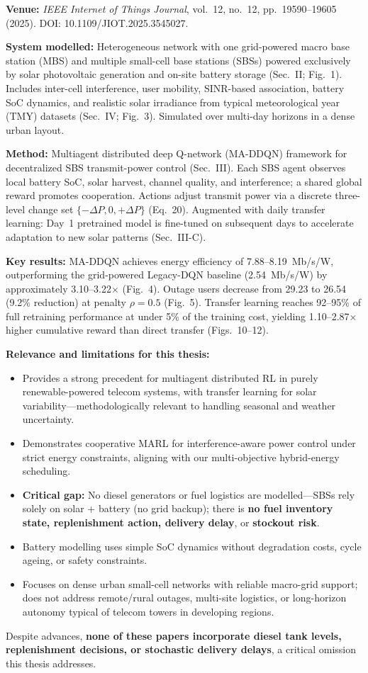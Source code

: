 \textbf{Venue:} \textit{IEEE Internet of Things Journal}, vol.~12, no.~12, pp.~19590--19605 (2025). DOI: 10.1109/JIOT.2025.3545027.

\textbf{System modelled:} Heterogeneous network with one grid-powered macro base station (MBS) and multiple small-cell base stations (SBSs) powered exclusively by solar photovoltaic generation and on-site battery storage (Sec.~II; Fig.~1). Includes inter-cell interference, user mobility, SINR-based association, battery SoC dynamics, and realistic solar irradiance from typical meteorological year (TMY) datasets (Sec.~IV; Fig.~3). Simulated over multi-day horizons in a dense urban layout.

\textbf{Method:} Multiagent distributed deep Q-network (MA-DDQN) framework for decentralized SBS transmit-power control (Sec.~III). Each SBS agent observes local battery SoC, solar harvest, channel quality, and interference; a shared global reward promotes cooperation. Actions adjust transmit power via a discrete three-level change set $\{-\Delta P, 0, +\Delta P\}$ (Eq.~20). Augmented with daily transfer learning: Day~1 pretrained model is fine-tuned on subsequent days to accelerate adaptation to new solar patterns (Sec.~III-C).

\textbf{Key results:} MA-DDQN achieves energy efficiency of 7.88--8.19~Mb/s/W, outperforming the grid-powered Legacy-DQN baseline (2.54~Mb/s/W) by approximately 3.10--3.22$\times$ (Fig.~4). Outage users decrease from 29.23 to 26.54 (9.2\% reduction) at penalty $\rho=0.5$ (Fig.~5). Transfer learning reaches 92--95\% of full retraining performance at under 5\% of the training cost, yielding 1.10--2.87$\times$ higher cumulative reward than direct transfer (Figs.~10--12).

\textbf{Relevance and limitations for this thesis:}
\begin{itemize}
    \item Provides a strong precedent for multiagent distributed RL in purely renewable-powered telecom systems, with transfer learning for solar variability---methodologically relevant to handling seasonal and weather uncertainty.
    \item Demonstrates cooperative MARL for interference-aware power control under strict energy constraints, aligning with our multi-objective hybrid-energy scheduling.
    \item \textbf{Critical gap:} No diesel generators or fuel logistics are modelled---SBSs rely solely on solar + battery (no grid backup); there is \textbf{no fuel inventory state, replenishment action, delivery delay}, or \textbf{stockout risk}.
    \item Battery modelling uses simple SoC dynamics without degradation costs, cycle ageing, or safety constraints.
    \item Focuses on dense urban small-cell networks with reliable macro-grid support; does not address remote/rural outages, multi-site logistics, or long-horizon autonomy typical of telecom towers in developing regions.
\end{itemize}
\noindent Despite advances, \textbf{none of these papers incorporate diesel tank levels, replenishment decisions, or stochastic delivery delays}, a critical omission this thesis addresses.

